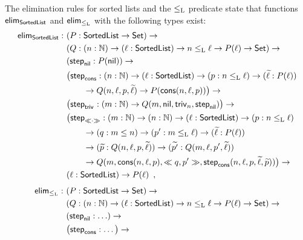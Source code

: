 \documentclass{article}
\begin{document}
\begin{example}
  The elimination rules for sorted lists and the $\lessList$ predicate
  state that functions $\elim_{\SortedList}$ and $\elim_{\lessList}$
  with the following types exist:
  \begin{align*}
    \elim_{\SortedList} :\ & (P : \SortedList \to \Set) \to \\
                       & (Q : (n : \Nat) \to (\ell : \SortedList) \to n \lessList \ell \to P(\ell) \to \Set) \to \\
                       & (\stepind{\nilList} : P(\nilList)) \to \\
                       & \big(\stepind{\consListbare} : (n : \Nat) \to (\ell : \SortedList) \to (p : n \lessList \ell) \to (\stepindarg{\ell} : P(\ell)) \\
                       & \qquad \to Q(n, \ell, p, \stepindarg{\ell}) \to P(\consList{n}{\ell}{p})\big) \to \\
                       & \big(\stepind{\nilLess{}} : (m : \Nat) \to Q(m, \nilList, \nilLess{n}, \stepind{\nilList})\big) \to \\
                       & \big(\stepind{\consLessbare} : (m : \Nat) \to (n : \Nat) \to (\ell : \SortedList) \to (p : n \lessList \ell) \\
                       & \qquad \to (q : m \leq n) \to (p' : m \lessList \ell) \to
                       (\stepindarg{\ell} : P(\ell)) \\ 
                       & \qquad \to (\stepindarg{p} : Q(n, \ell,p, \stepindarg{\ell}))
                       \to (\stepindarg{p'} : Q(m, \ell, p', \stepindarg{\ell})) \\
                       & \qquad \to Q(m,\consList{n}{\ell}{p}, \consLess{m}{n}{\ell}{p}{q}{p'}, \stepind{\consListbare}(n, \ell, p, \stepindarg{\ell}, \stepindarg{p}))\big) \to \\
                       & (\ell : \SortedList) \to P(\ell) \enspace , \\
  \end{align*}
  \begin{align*}
% 
     \elim_{\lessList} :\ & (P : \SortedList \to \Set) \to \\
                       & (Q : (n : \Nat) \to (\ell : \SortedList) \to n \lessList \ell \to P(\ell) \to \Set) \to \\
                       & (\stepind{\nilList} : \ldots) \to \\
                       & \big(\stepind{\consListbare} : \ldots\big) \to \\

\end{align*}
\end{example}
\end{document}
